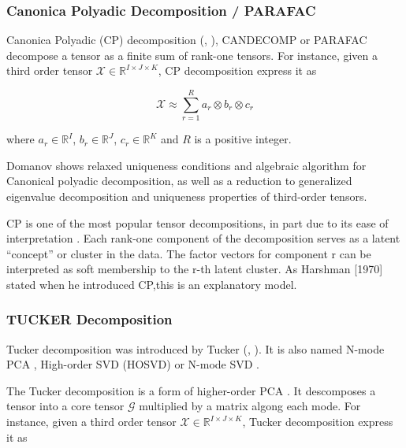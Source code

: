 \documentclass[letterpaper,12pt]{article}
\begin{document}
\subsubsection{Canonica Polyadic Decomposition / PARAFAC}

Canonica Polyadic (CP) decomposition (\cite{Kolda2009}, \cite{Mocks1988}), CANDECOMP \cite{Carroll1970} or PARAFAC \cite{Harshman1970} decompose a tensor as a finite sum of rank-one tensors. For instance, given a third order tensor $\mathcal{X}\in\mathbb{R}^{I\times J\times K}$, CP decomposition express it as 

\begin{equation}
 \mathcal{X}\approx \sum_{r=1}^{R}a_r\otimes b_r \otimes c_r
\end{equation}\label{eq:cp}

where $a_r\in\mathbb{R}^I$, $b_r\in\mathbb{R}^J$, $c_r\in\mathbb{R}^K$ and $R$ is a positive integer.



Domanov \cite{Domanov2015} shows relaxed uniqueness conditions and algebraic algorithm for Canonical polyadic decomposition, as well as a reduction to generalized eigenvalue decomposition \cite{Domanov2014} and uniqueness properties \cite{Domanov2013} of third-order tensors.

CP is one of the most popular tensor decompositions, in part due to its ease of interpretation \cite{Papalexakis2016}. Each rank-one component of the decomposition serves as a latent “concept” or cluster in the data. The factor vectors for component r can be interpreted as soft membership to the r-th latent cluster. As Harshman [1970] stated when he introduced CP,this is an explanatory model.


\subsubsection{TUCKER Decomposition}

Tucker decomposition was introduced by Tucker (\cite{Tucker1963}, \cite{Tucker1964}). It is also named N-mode PCA \cite{Kapteyn1986}, High-order SVD (HOSVD) \cite{DeLathauwer2000} or N-mode SVD \cite{Vasilescu2002}.

The Tucker decomposition is a form of higher-order PCA \cite{Kolda2009}. It descomposes a tensor into a core tensor $\mathcal{G}$ multiplied by a matrix algong each mode. For instance, given a third order tensor $\mathcal{X}\in\mathbb{R}^{I\times J\times K}$, Tucker decomposition express it as 
\end{document}
